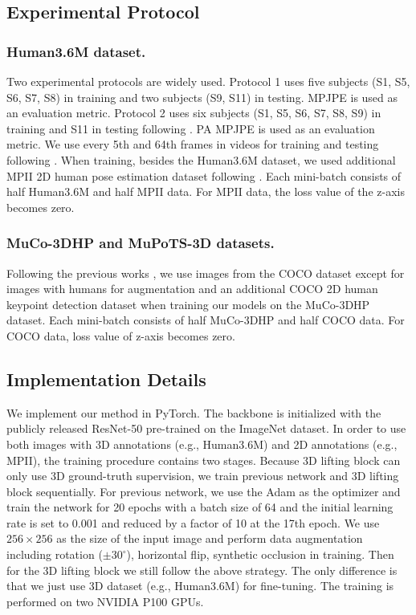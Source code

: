 \documentclass[letterpaper]{article} \usepackage{aaai21}  \usepackage{times}  \usepackage{helvet} \usepackage{courier}  \usepackage[hyphens]{url}  \usepackage{graphicx} \urlstyle{rm} \def\UrlFont{\rm}  \usepackage{natbib}  \usepackage{caption} \frenchspacing  \setlength{\pdfpagewidth}{8.5in}  \setlength{\pdfpageheight}{11in}
\begin{document}
\subsection{Experimental Protocol}

\subsubsection{Human3.6M dataset.}
Two experimental protocols are widely used. Protocol 1 uses five subjects (S1, S5, S6, S7, S8) in training and two subjects (S9, S11) in testing. MPJPE is used as an evaluation metric. Protocol 2 uses six subjects (S1, S5, S6, S7, S8, S9) in training and S11 in testing following \cite{zhou2018monocap,rogez2019lcr,moon2019camera}. PA MPJPE is used as an evaluation metric. We use every 5th and 64th frames in videos for training and testing following \cite{sun2017compositional,sun2018integral}. When training, besides the Human3.6M dataset, we used additional MPII 2D human pose estimation dataset \cite{andriluka20142d} following \cite{pavlakos2017coarse,sun2017compositional,sun2018integral,moon2019camera}. Each mini-batch consists of half Human3.6M and half MPII data. For MPII data, the loss value of the z-axis becomes zero. 

\subsubsection{MuCo-3DHP and MuPoTS-3D datasets.}
Following the previous works \cite{mehta2018single,moon2019camera}, we use images from the COCO dataset \cite{lin2014microsoft} except for images with humans for augmentation and an additional COCO 2D human keypoint detection dataset when training our models on the MuCo-3DHP dataset. Each mini-batch consists of half MuCo-3DHP and half COCO data. For COCO data, loss value of z-axis becomes zero.




\subsection{Implementation Details}

We implement our method in PyTorch. The backbone is initialized with the publicly released ResNet-50 pre-trained on the ImageNet dataset. In order to use both images with 3D annotations (e.g., Human3.6M) and 2D annotations (e.g., MPII), the training procedure contains two stages. Because 3D lifting block can only use 3D ground-truth supervision, we train previous network and 3D lifting block sequentially. For previous network, we use the Adam as the optimizer and train the network for 20 epochs with a batch size of 64 and the initial learning rate is set to 0.001 and reduced by a factor of 10 at the 17th epoch. We use $256\times256$ as the size of the input image and perform data augmentation including rotation ($\pm30^{\circ}$), horizontal flip, synthetic occlusion in training. Then for the 3D lifting block we still follow the above strategy. The only difference is that we just use 3D dataset (e.g., Human3.6M) for fine-tuning. The training is performed on two NVIDIA P100 GPUs.
\end{document}

